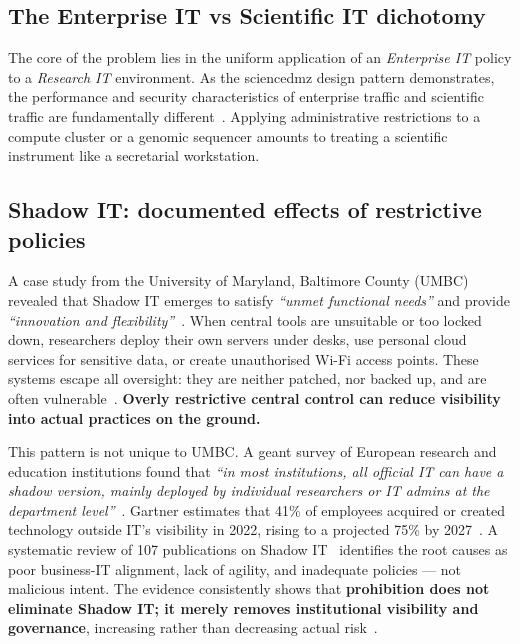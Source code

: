 \subsection{The Enterprise IT vs Scientific IT dichotomy}

The core of the problem lies in the uniform application of an
\emph{Enterprise IT} policy to a \emph{Research IT} environment.
As the \gls{sciencedmz} design pattern demonstrates, the performance and
security characteristics of enterprise traffic and scientific traffic
are fundamentally different~\cite{dart2013}. Applying administrative
restrictions to a compute cluster or a genomic sequencer
amounts to treating a scientific instrument like a secretarial workstation.

\subsection{Shadow IT: documented effects of restrictive policies}
\label{subsec:shadow-it}

A case study from the University of Maryland, Baltimore County (UMBC) revealed that
Shadow IT emerges to satisfy \emph{``unmet functional
needs''} and provide \emph{``innovation and flexibility''}~\cite{shadow-it-umbc}.
When central tools are unsuitable or too locked down,
researchers deploy their own servers under desks, use
personal cloud services for sensitive data, or create
unauthorised Wi-Fi access points. These systems escape all
oversight: they are neither patched, nor backed up, and are often
vulnerable~\cite{shadow-it-threatlocker}. \textbf{Overly restrictive central control can reduce visibility
into actual practices on the ground.}

This pattern is not unique to UMBC. A \gls{geant} survey of European
research and education institutions found that \emph{``in most
institutions, all official IT can have a shadow version, mainly
deployed by individual researchers or IT admins at the department
level''}~\cite{geant-shadow-it}. Gartner estimates that 41\% of
employees acquired or created technology outside IT's visibility in
2022, rising to a projected 75\% by
2027~\cite{gartner-shadow-it}. A systematic review of 107
publications on Shadow IT~\cite{klotz2019} identifies the root
causes as poor business-IT alignment, lack of agility, and
inadequate policies --- not malicious intent. The evidence
consistently shows that \textbf{prohibition does not eliminate
Shadow IT; it merely removes institutional visibility and
governance}, increasing rather than decreasing actual
risk~\cite{silic2014,mallmann2018}.

